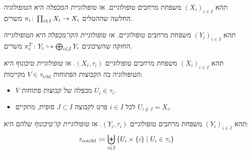 \documentclass[name=רשימות טופולוגיה כללית]{../../../tex/classes/noChapterMegasumPreamble}
\begin{document}
	\begin{Definition}[מכפלה]
		תהא $(X_i)_{i \in I}$ משפחת מרחבים טופולוגיים. אז \textit{טופולוגיית המכפלה} היא הטופולוגיה החלשה שההטלים $\pi_i \colon \prod_{i \in I}X_i \to X_i$ משרים. 
	\end{Definition}
	\begin{Definition}[קו־מכפלה]
		תהא $(Y_i)_{i \in I}$ משפחת מרחבים טופולוגיים. אז \textit{טופולוגיית הקו־מכפלה} היא הטופולוגייה החזקה שהשיכונים $\pi_i^T \colon Y_i \hookrightarrow \bigoplus_{i \in I}Y_i$ משרים. 
	\end{Definition}
	\begin{Definition}
		תהא $(X_i)_{i \in I}$ משפחת מרחבים טופולוגיים $(X_i, \tau_i)$. אז \textit{טופולוגיית טיכונוף} היא הטופולוגיה בה הקבוצות הפתוחות $V \in \tau_{\mathrm{tchf}}$ מקיימות: 
		\begin{itemize}
			\item $V$ מכפלה של קבוצות פתוחות $U_i \in \tau_i$. 
			\item לכל $i \in I$ פרט לקבוצה $J \subset I$ סופית, מתקיים $U_{i \notin J} = X_i$. 
		\end{itemize}
	\end{Definition}
	\begin{Definition}
		תהא $(Y_i)_{i \in I}$ משפחת מרחבים טופולוגיים $(Y_i, \tau_i)$. אז \textit{טופולוגיית קו־טיכונוף} שלהם היא: 
		\[ \tau_{\mathrm{cotchf}} \coloneqq \biguplus_{i \in I} \left \{ U_i \times \{i\} \mid U_i \in \tau_i \right \} \]
	\end{Definition}
\end{document}
